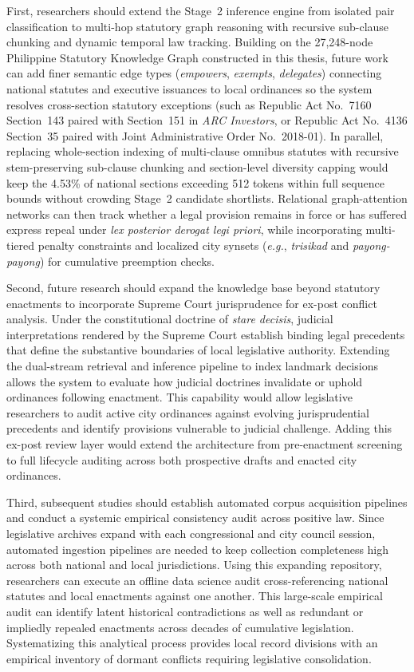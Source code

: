First, researchers should extend the Stage~2 inference engine from isolated pair classification to multi-hop statutory graph reasoning with recursive sub-clause chunking and dynamic temporal law tracking. Building on the 27,248-node Philippine Statutory Knowledge Graph constructed in this thesis, future work can add finer semantic edge types (\textit{empowers}, \textit{exempts}, \textit{delegates}) connecting national statutes and executive issuances to local ordinances so the system resolves cross-section statutory exceptions (such as Republic Act No.~7160 Section~143 paired with Section~151 in \textit{ARC Investors}, or Republic Act No.~4136 Section~35 paired with Joint Administrative Order No.~2018-01). In parallel, replacing whole-section indexing of multi-clause omnibus statutes with recursive stem-preserving sub-clause chunking and section-level diversity capping would keep the 4.53\% of national sections exceeding 512 tokens within full sequence bounds without crowding Stage~2 candidate shortlists. Relational graph-attention networks can then track whether a legal provision remains in force or has suffered express repeal under \textit{lex posterior derogat legi priori}, while incorporating multi-tiered penalty constraints and localized city synsets (\textit{e.g.}, \textit{trisikad} and \textit{payong-payong}) for cumulative preemption checks.

Second, future research should expand the knowledge base beyond statutory enactments to incorporate Supreme Court jurisprudence for ex-post conflict analysis. Under the constitutional doctrine of \textit{stare decisis}, judicial interpretations rendered by the Supreme Court establish binding legal precedents that define the substantive boundaries of local legislative authority. Extending the dual-stream retrieval and inference pipeline to index landmark decisions allows the system to evaluate how judicial doctrines invalidate or uphold ordinances following enactment. This capability would allow legislative researchers to audit active city ordinances against evolving jurisprudential precedents and identify provisions vulnerable to judicial challenge. Adding this ex-post review layer would extend the architecture from pre-enactment screening to full lifecycle auditing across both prospective drafts and enacted city ordinances.

Third, subsequent studies should establish automated corpus acquisition pipelines and conduct a systemic empirical consistency audit across positive law. Since legislative archives expand with each congressional and city council session, automated ingestion pipelines are needed to keep collection completeness high across both national and local jurisdictions. Using this expanding repository, researchers can execute an offline data science audit cross-referencing national statutes and local enactments against one another. This large-scale empirical audit can identify latent historical contradictions as well as redundant or impliedly repealed enactments across decades of cumulative legislation. Systematizing this analytical process provides local record divisions with an empirical inventory of dormant conflicts requiring legislative consolidation.

